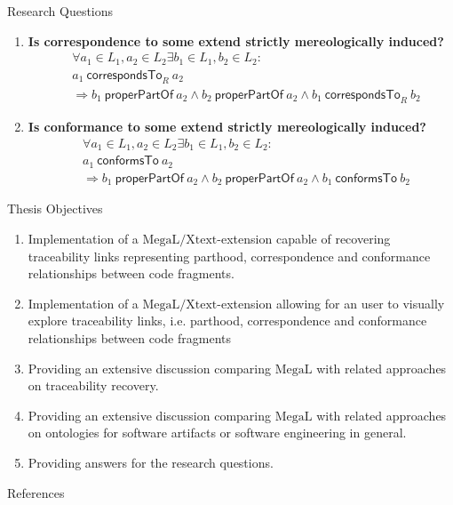\documentclass{beamer}
\newcommand{\properPartOf}{~\textsf{properPartOf}~}
\newcommand{\correspondsToR}[1]{~\textsf{correspondsTo}_{#1}~}
\newcommand{\conformsTo}{~\textsf{conformsTo}~}
\newcommand{\megal}{\text{MegaL}}
\newcommand{\megalxtext}{\text{MegaL/Xtext}}
\begin{document}
\begin{frame}{Research Questions}
\begin{enumerate}[RQ1]

\item
\textbf{Is correspondence to some extend strictly mereologically induced?}
{\scriptsize
\begin{align*}
&\forall a_1 \in L_1, a_2 \in L_2 \exists b_1 \in L_1, b_2 \in L_2 :
\\&a_1 \correspondsToR{R} a_2
\\&\Rightarrow 
b_1 \properPartOf a_2 
\wedge b_2 \properPartOf a_2 
\wedge b_1 \correspondsToR{R} b_2
\end{align*}
}

\item
\textbf{Is conformance to some extend strictly mereologically induced?}
{\scriptsize
\begin{align*}
&\forall a_1 \in L_1, a_2 \in L_2 \exists b_1 \in L_1, b_2 \in L_2 :
\\&a_1 \conformsTo a_2
\\&\Rightarrow 
b_1 \properPartOf a_2 
\wedge b_2 \properPartOf a_2 
\wedge b_1 \conformsTo b_2
\end{align*}
}

\end{enumerate}
\end{frame}

\begin{frame}{Thesis Objectives}
\small
\begin{enumerate}[TO1]
\item
Implementation of a $\megalxtext$-extension\cite{LukasHaertelBScThesis} capable of recovering traceability links representing parthood, correspondence and conformance relationships between code fragments.

\item
Implementation of a $\megalxtext$-extension\cite{LukasHaertelBScThesis} allowing for an user to visually explore traceability links, i.e. parthood, correspondence and conformance relationships between code fragments

\item
Providing an extensive discussion comparing $\megal$\cite{DBLP:conf/models/FavreLV12} with related approaches on traceability recovery.

\item
Providing an extensive discussion comparing $\megal$\cite{DBLP:conf/models/FavreLV12} with related approaches on ontologies for software artifacts or software engineering in general.

\item
Providing answers for the research questions.
\end{enumerate}
\end{frame}

\begin{frame}{References}
\tiny{}
{}
\end{frame}
\end{document}
